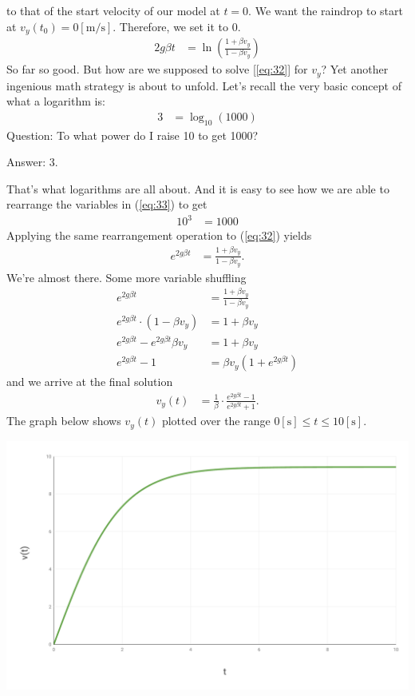 \documentclass[paper=a4, fontsize=11pt]{scrartcl} %
\numberwithin{equation}{section} %
\numberwithin{figure}{section} %
\numberwithin{table}{section} %
\begin{document}
to that of the start velocity of our model at $t = 0$. We want the raindrop to start at $v_y(t_0) = 0 [\si{\meter\per\second}]$.
Therefore, we set it to 0.
\begin{align} 
2 g \beta t &=  \ln{\left(\frac{1 + \beta v_y}{1 - \beta v_y} \right)} \label{eq:32}
\end{align}
So far so good. But how are we supposed to solve [\ref{eq:32}] for $v_y$? Yet another ingenious math strategy is about to unfold.
Let's recall the very basic concept of what a logarithm is:
\begin{align} 
3 &=  \log_{10}{(1000)} \label{eq:33}
\end{align}
Question: To what power do I raise 10 to get 1000?

Answer: 3.
\vspace{\baselineskip}

That's what logarithms are all about. And it is easy to see how we are able to rearrange the variables in (\ref{eq:33})
to get
\begin{align} 
10^3 &=  1000 \label{eq:34}
\end{align}
Applying the same rearrangement operation to (\ref{eq:32}) yields
\begin{align} 
e^{2 g \beta t} &=  \frac{1 + \beta v_y}{1 - \beta v_y}. \label{eq:35}
\end{align}
We're almost there. Some more variable shuffling 
\begin{align} 
e^{2 g \beta t} &=  \frac{1 + \beta v_y}{1 - \beta v_y} \\
e^{2 g \beta t} \cdot \left(1 - \beta v_y \right) &= 1 + \beta v_y  \\
e^{2 g \beta t} - e^{2 g \beta t}\beta v_y &= 1 + \beta v_y  \\
e^{2 g \beta t} - 1 &= \beta v_y (1 + e^{2 g \beta t})
\end{align}
and we arrive at the final solution
\begin{align}
v_y(t) &= \frac{1}{\beta} \cdot \frac{e^{2 g \beta t} - 1}{e^{2 g \beta t} + 1}.\label{eq:36}
\end{align}
The graph below shows $v_y(t)$ plotted over the range $0[\si{\second}] \leq t \leq 10[\si{\second}]$.

\includegraphics[width=.95\linewidth]{graph}
\end{document}

